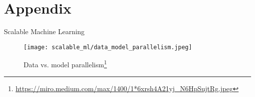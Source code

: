 \section{Appendix}

\begin{frame}{Scalable Machine Learning}

    \begin{figure}[H]
        \texttt{[image: scalable\_ml/data\_model\_parallelism.jpeg]}
        \caption*{Data vs. model parallelism\footnote{\url{https://miro.medium.com/max/1400/1*6xrsh4A21yj_N6HpSujtRg.jpeg}}}
    \end{figure}

\end{frame}